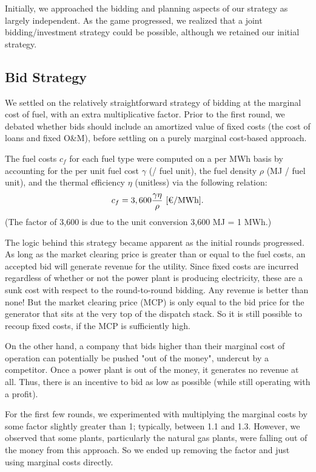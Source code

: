 \documentclass[journal,11pt]{IEEEtran}
\begin{document}
Initially, we approached the bidding and planning aspects of our strategy as largely independent. 
As the game progressed, we realized that a joint bidding/investment strategy could be possible, although
we retained our initial strategy.

\subsection{Bid Strategy}

We settled on the relatively straightforward strategy of bidding at the marginal cost of fuel, with an extra multiplicative
factor. Prior to the first round, we debated whether bids should include an amortized value of fixed costs (the cost of loans and fixed O\&M),
before settling on a purely marginal cost-based approach.

The fuel costs $c_f$ for each fuel type were computed on a per MWh basis by accounting for the per unit fuel cost $\gamma$ (\texteuro / fuel unit),
the fuel density $\rho$ (MJ / fuel unit), and the thermal efficiency $\eta$ (unitless) via the following relation:
\begin{equation}
    c_f = 3,600 \frac{\gamma \eta}{\rho} \text{ [\texteuro/MWh]}.
\end{equation}
(The factor of 3,600 is due to the unit conversion 3,600 MJ = 1 MWh.)

The logic behind this strategy became apparent as the initial rounds progressed. As long as the market clearing
price is greater than or equal to the fuel costs, an accepted bid will generate revenue for the utility. Since
fixed costs are incurred regardless of whether or not the power plant is producing electricity, these are a sunk cost
with respect to the round-to-round bidding. Any revenue is better than none! But the market clearing price (MCP) is only
equal to the bid price for the generator that sits at the very top of the dispatch stack. So it is still possible
to recoup fixed costs, if the MCP is sufficiently high.

On the other hand, a company that bids higher than their marginal cost of operation can potentially be pushed "out of the money",
undercut by a competitor. Once a power plant is out of the money, it generates no revenue at all. Thus, there is an incentive
to bid as low as possible (while still operating with a profit).

For the first few rounds, we experimented with multiplying the marginal costs by some factor slightly greater than 1; typically, between 1.1 and 1.3.
However, we observed that some plants, particularly the natural gas plants, were falling out of the money from this approach. So we ended up removing the
factor and just using marginal costs directly.
\end{document}
